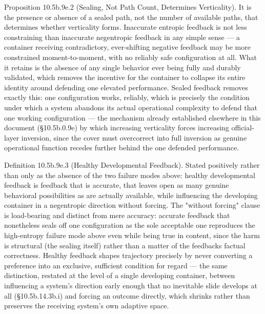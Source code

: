 \documentclass[
]{article}
\begin{document}
Proposition 10.5b.9e.2 (Sealing, Not Path Count, Determines
Verticality). It is the presence or absence of a sealed path, not the
number of available paths, that determines whether verticality forms.
Inaccurate entropic feedback is not less constraining than inaccurate
negentropic feedback in any simple sense --- a container receiving
contradictory, ever-shifting negative feedback may be more constrained
moment-to-moment, with no reliably safe configuration at all. What it
retains is the absence of any single behavior ever being fully and
durably validated, which removes the incentive for the container to
collapse its entire identity around defending one elevated performance.
Sealed feedback removes exactly this: one configuration works, reliably,
which is precisely the condition under which a system abandons its
actual operational complexity to defend that one working configuration
--- the mechanism already established elsewhere in this document
(§10.5b.0.9e) by which increasing verticality forces increasing
official-layer inversion, since the cover must overcorrect into full
inversion as genuine operational function recedes further behind the one
defended performance.

Definition 10.5b.9e.3 (Healthy Developmental Feedback). Stated
positively rather than only as the absence of the two failure modes
above: healthy developmental feedback is feedback that is accurate, that
leaves open as many genuine behavioral possibilities as are actually
available, while influencing the developing container in a negentropic
direction without forcing. The "without forcing" clause is load-bearing
and distinct from mere accuracy: accurate feedback that nonetheless
seals off one configuration as the sole acceptable one reproduces the
high-entropy failure mode above even while being true in content, since
the harm is structural (the sealing itself) rather than a matter of the
feedbacks factual correctness. Healthy feedback shapes trajectory
precisely by never converting a preference into an exclusive, sufficient
condition for regard --- the same distinction, restated at the level of
a single developing container, between influencing a system's direction
early enough that no inevitable slide develops at all (§10.5b.14.3b.i)
and forcing an outcome directly, which shrinks rather than preserves the
receiving system's own adaptive space.
\end{document}
